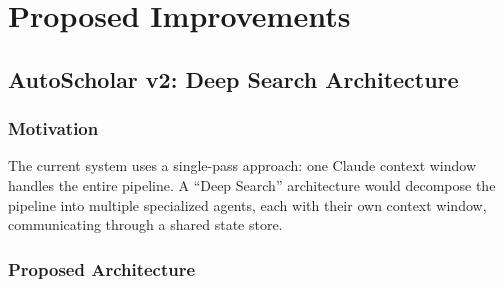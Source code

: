 \chapter{Proposed Improvements}
\label{ch:improvements}

\section{AutoScholar v2: Deep Search Architecture}
\label{sec:improve:deepsearch}

\subsection{Motivation}

The current system uses a single-pass approach: one Claude context window handles the entire pipeline.
A ``Deep Search'' architecture would decompose the pipeline into multiple specialized agents, each with their own context window, communicating through a shared state store.

\subsection{Proposed Architecture}

